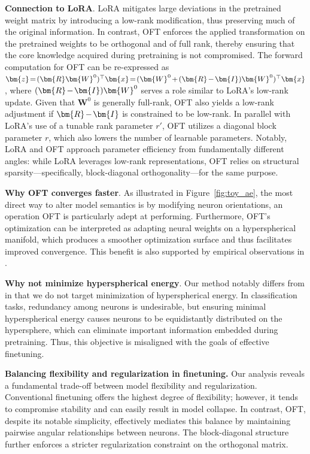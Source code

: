 \textbf{Connection to LoRA}. LoRA mitigates large deviations in the pretrained weight matrix by introducing a low-rank modification, thus preserving much of the original information. In contrast, OFT enforces the applied transformation on the pretrained weights to be orthogonal and of full rank, thereby ensuring that the core knowledge acquired during pretraining is not compromised. The forward computation for OFT can be re-expressed as $\thickmuskip=2mu \medmuskip=2mu \bm{z}=(\bm{R}\bm{W}^0)^\top\bm{x}=(\bm{W}^0+(\bm{R}-\bm{I})\bm{W}^0)^\top\bm{x}$, where $\thickmuskip=2mu \medmuskip=2mu (\bm{R}-\bm{I})\bm{W}^0$ serves a role similar to LoRA’s low-rank update. Given that $\bm{W}^0$ is generally full-rank, OFT also yields a low-rank adjustment if $\thickmuskip=2mu \medmuskip=2mu \bm{R}-\bm{I}$ is constrained to be low-rank. In parallel with LoRA’s use of a tunable rank parameter $r'$, OFT utilizes a diagonal block parameter $r$, which also lowers the number of learnable parameters. Notably, LoRA and OFT approach parameter efficiency from fundamentally different angles: while LoRA leverages low-rank representations, OFT relies on structural sparsity—specifically, block-diagonal orthogonality—for the same purpose.

\textbf{Why OFT converges faster}. As illustrated in Figure~\ref{fig:toy_ae}, the most direct way to alter model semantics is by modifying neuron orientations, an operation OFT is particularly adept at performing. Furthermore, OFT's optimization can be interpreted as adapting neural weights on a hyperspherical manifold, which produces a smoother optimization surface and thus facilitates improved convergence. This benefit is also supported by empirical observations in \cite{liu2021orthogonal}.

\textbf{Why not minimize hyperspherical energy}. Our method notably differs from \cite{liu2021orthogonal} in that we do not target minimization of hyperspherical energy. In classification tasks, redundancy among neurons is undesirable, but ensuring minimal hyperspherical energy causes neurons to be equidistantly distributed on the hypersphere, which can eliminate important information embedded during pretraining. Thus, this objective is misaligned with the goals of effective finetuning.

\textbf{Balancing flexibility and regularization in finetuning.} Our analysis reveals a fundamental trade-off between model flexibility and regularization. Conventional finetuning offers the highest degree of flexibility; however, it tends to compromise stability and can easily result in model collapse. In contrast, OFT, despite its notable simplicity, effectively mediates this balance by maintaining pairwise angular relationships between neurons. The block-diagonal structure further enforces a stricter regularization constraint on the orthogonal matrix.


